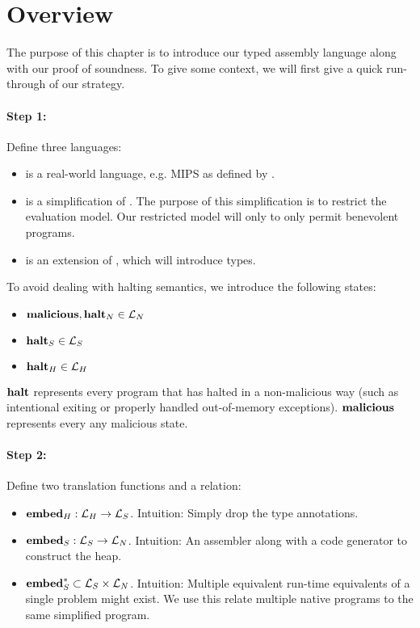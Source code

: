 \section{Overview}

The purpose of this chapter is to introduce our typed assembly language along
with our proof of soundness. To give some context, we will first give a quick
run-through of our strategy.

\paragraph{Step 1:} Define three languages:

\begin{itemize}
\item \nativelang is a real-world language, e.g. MIPS as defined by
  \cite{mipssys}.
\item \simplelang is a simplification of \nativelang. The purpose of
  this simplification is to restrict the evaluation model. Our restricted model
  will only to only permit benevolent programs.
\item \highlang is an extension of \simplelang, which will
  introduce types.
\end{itemize}

To avoid dealing with halting semantics, we introduce the following states:
\begin{itemize}
\item ${\mathbf{malicious}}, {\mathbf{halt}_N} \in \mathcal{L}_N$
\item ${\mathbf{halt}_S} \in \mathcal{L}_S$
\item ${\mathbf{halt}_H} \in \mathcal{L}_H$
\end{itemize}

$\mathbf{halt}$ represents every program that has halted in a non-malicious way (such as
intentional exiting or properly handled out-of-memory exceptions). ${\mathbf{malicious}}$
represents every any malicious state.

\paragraph{Step 2:} Define two translation functions and a relation:

\begin{itemize}
\item ${{\mathbf{embed}}_H} : \mathcal{L}_H -> \mathcal{L}_S$. Intuition: Simply drop the type
  annotations.
\item ${{\mathbf{embed}}_S} : \mathcal{L}_S -> \mathcal{L}_N$. Intuition: An assembler
  along with a code generator to construct the heap.
\item ${\mathbf{embed}^\ast_S} \subset \mathcal{L}_S \times \mathcal{L}_N$. Intuition:
  Multiple equivalent run-time equivalents of a single problem might exist. We
  use this relate multiple native programs to the same simplified program.
\end{itemize}

